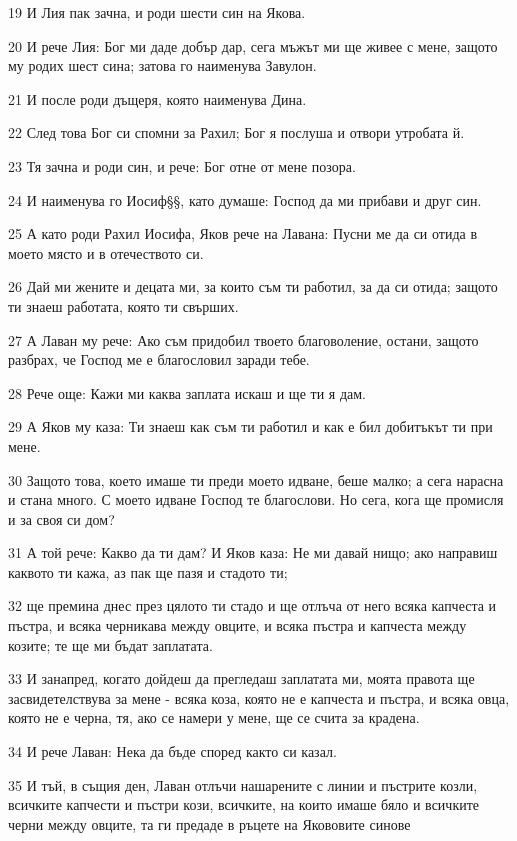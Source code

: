 \par 19 И Лия пак зачна, и роди шести син на Якова.
\par 20 И рече Лия: Бог ми даде добър дар, сега мъжът ми ще живее с мене, защото му родих шест сина; затова го наименува Завулон.
\par 21 И после роди дъщеря, която наименува Дина.
\par 22 След това Бог си спомни за Рахил; Бог я послуша и отвори утробата й.
\par 23 Тя зачна и роди син, и рече: Бог отне от мене позора.
\par 24 И наименува го Иосиф§§, като думаше: Господ да ми прибави и друг син.
\par 25 А като роди Рахил Иосифа, Яков рече на Лавана: Пусни ме да си отида в моето място и в отечеството си.
\par 26 Дай ми жените и децата ми, за които съм ти работил, за да си отида; защото ти знаеш работата, която ти свърших.
\par 27 А Лаван му рече: Ако съм придобил твоето благоволение, остани, защото разбрах, че Господ ме е благословил заради тебе.
\par 28 Рече още: Кажи ми каква заплата искаш и ще ти я дам.
\par 29 А Яков му каза: Ти знаеш как съм ти работил и как е бил добитъкът ти при мене.
\par 30 Защото това, което имаше ти преди моето идване, беше малко; а сега нарасна и стана много. С моето идване Господ те благослови. Но сега, кога ще промисля и за своя си дом?
\par 31 А той рече: Какво да ти дам? И Яков каза: Не ми давай нищо; ако направиш каквото ти кажа, аз пак ще пазя и стадото ти;
\par 32 ще премина днес през цялото ти стадо и ще отлъча от него всяка капчеста и пъстра, и всяка черникава между овците, и всяка пъстра и капчеста между козите; те ще ми бъдат заплатата.
\par 33 И занапред, когато дойдеш да прегледаш заплатата ми, моята правота ще засвидетелствува за мене - всяка коза, която не е капчеста и пъстра, и всяка овца, която не е черна, тя, ако се намери у мене, ще се счита за крадена.
\par 34 И рече Лаван: Нека да бъде според както си казал.
\par 35 И тъй, в същия ден, Лаван отлъчи нашарените с линии и пъстрите козли, всичките капчести и пъстри кози, всичките, на които имаше бяло и всичките черни между овците, та ги предаде в ръцете на Якововите синове
